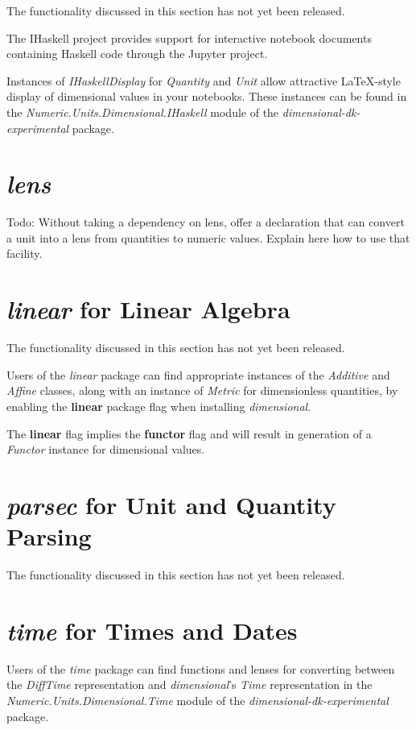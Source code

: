 \documentclass[11pt]{report}
\newcommand{\packagename}[1]{\textit{#1}}
\newcommand{\thispackage}{\packagename{dimensional}}
\newcommand{\experimentalpackage}{\packagename{dimensional-dk-experimental}}
\newcommand{\classname}[1]{\textit{#1}}
\newcommand{\typename}[1]{\textit{#1}}
\newcommand{\modulename}[1]{\textit{#1}}
\newcommand{\submodule}[1]{\modulename{Numeric.Units.Dimensional.{#1}}}
\newcommand{\flag}[1]{\textbf{#1}}
\newcommand{\prerelease}{\begin{tcolorbox}
The functionality discussed in this section has not yet been released.
\end{tcolorbox}}
\begin{document}
\prerelease{}

The IHaskell project provides support for interactive notebook documents containing
Haskell code through the Jupyter project.

Instances of \classname{IHaskellDisplay} for \typename{Quantity} and \typename{Unit}
allow attractive \LaTeX{}-style display of dimensional values in your notebooks. These
instances can be found in the \submodule{IHaskell} module of the \experimentalpackage{}
package.

\section{\packagename{lens}}

Todo: Without taking a dependency on lens, offer a declaration that can convert a unit into a lens from quantities to numeric values.
Explain here how to use that facility.

\section{\packagename{linear} for Linear Algebra}

\prerelease{}

Users of the \packagename{linear} package can find appropriate instances of
the \classname{Additive} and \classname{Affine} classes, along with an
instance of \classname{Metric} for dimensionless quantities, by enabling the \flag{linear}
package flag when installing \thispackage{}.

The \flag{linear} flag implies the \flag{functor} flag and will result in generation of a \classname{Functor}
instance for dimensional values.

\section{\packagename{parsec} for Unit and Quantity Parsing}

\prerelease{}

\section{\packagename{time} for Times and Dates}

Users of the \packagename{time} package can find functions and lenses for converting
between the \typename{DiffTime} representation and \thispackage{}'s \typename{Time} representation in the
\submodule{Time} module of the \experimentalpackage{} package.
\end{document}
